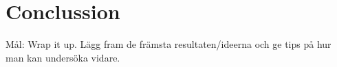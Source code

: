\documentclass[11pt,twoside]{eitExjobb}
\begin{document}

\chapter{Conclussion}\label{chap:conc}

Mål: Wrap it up. Lägg fram de främsta resultaten/ideerna och ge tips på hur man kan undersöka vidare.





\end{document}
